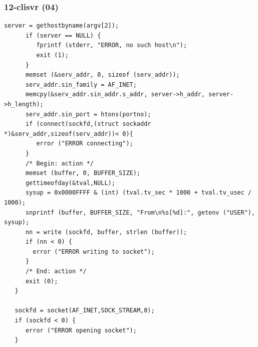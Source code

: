 \documentclass[aspectratio=169, xcolor=table, notheorems, hyperref={pdfpagelabels=false}]{beamer}
\begin{document}
\begin{frame}[fragile]
\frametitle{12-clisvr (04)}
\begin{lstlisting}[basicstyle=\ttfamily\tiny]
      server = gethostbyname(argv[2]);
      if (server == NULL) {
         fprintf (stderr, "ERROR, no such host\n");
         exit (1);
      }
      memset (&serv_addr, 0, sizeof (serv_addr));
      serv_addr.sin_family = AF_INET;
      memcpy(&serv_addr.sin_addr.s_addr, server->h_addr, server->h_length);
      serv_addr.sin_port = htons(portno);
      if (connect(sockfd,(struct sockaddr *)&serv_addr,sizeof(serv_addr))< 0){
         error ("ERROR connecting");
      }
      /* Begin: action */
      memset (buffer, 0, BUFFER_SIZE);
      gettimeofday(&tval,NULL);
      sysup = 0x0000FFFF & (int) (tval.tv_sec * 1000 + tval.tv_usec / 1000);
      snprintf (buffer, BUFFER_SIZE, "From\n%s[%d]:", getenv ("USER"), sysup);
      nn = write (sockfd, buffer, strlen (buffer));
      if (nn < 0) {
        error ("ERROR writing to socket");
      }
      /* End: action */
      exit (0);
   }

   sockfd = socket(AF_INET,SOCK_STREAM,0);
   if (sockfd < 0) {
      error ("ERROR opening socket");
   }

\end{lstlisting}
\end{frame}
\end{document}
